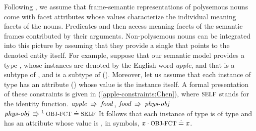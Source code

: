 \documentclass[output=paper,colorlinks,citecolor=brown,chinesefont]{langscibook}
\begin{document}
Following \citet{chen2022frame}, we assume that frame-semantic representations of polysemous nouns come with facet attributes whose values characterize the individual meaning facets of the nouns.
Predicates and  then access meaning facets of the semantic frames contributed by their arguments.
Non-polysemous nouns can be integrated into this picture by assuming that they provide a single  that points to the denoted entity itself.
For example, suppose that our semantic model provides a type , whose instances are denoted by the English word \emph{apple}, and that  is a subtype of , and   is a subtype of  ().
Moreover, let us assume that each instance of type  has an attribute  () whose value is the instance itself.
A formal presentation of these constraints is given in (\ref{apple-constraints:Chen}), where $\SELF$ stands for the identity function.
\ea\label{apple-constraints:Chen}
\ea\label{apple-physobj:Chen}
$\textit{apple}\:\Rrightarrow\:\textit{food}$\,, \quad
$\textit{food}\:\Rrightarrow\:\textit{phys-obj}$
\ex\label{self-constraint:Chen}
$\type{phys-obj}\:\implic\footnotemark{}\:\feat{obj-fct}\patheq\feat{self}$ 
\z
\z
{}
It follows that each instance  of type  is of type  and has an attribute  whose value is , in symbols, $\xvar{x}\cdot\feat{obj-fct}\valeq\xvar{x}$.
\end{document}
